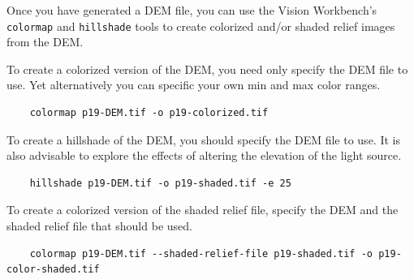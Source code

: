 %

Once you have generated a DEM file, you can use the Vision Workbench's
\texttt{colormap} and \texttt{hillshade} tools to create colorized
and/or shaded relief images from the DEM.

To create a colorized version of the DEM, you need only specify the
DEM file to use. Yet alternatively you can specific your own min and
max color ranges.

\begin{verbatim}
    colormap p19-DEM.tif -o p19-colorized.tif
\end{verbatim}

To create a hillshade of the DEM, you should specify the DEM file
to use. It is also advisable to explore the effects of altering the
elevation of the light source.

\begin{verbatim}
    hillshade p19-DEM.tif -o p19-shaded.tif -e 25
\end{verbatim}

To create a colorized version of the shaded relief file, specify
the DEM and the shaded relief file that should be used.

\begin{verbatim}
    colormap p19-DEM.tif --shaded-relief-file p19-shaded.tif -o p19-color-shaded.tif
\end{verbatim}

